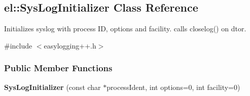 \hypertarget{a00088}{}\subsection{el\+:\+:Sys\+Log\+Initializer Class Reference}
\label{a00088}


Initializes syslog with process I\+D, options and facility. calls closelog() on d\textquotesingle{}tor.  




{\ttfamily \#include $<$easylogging++.\+h$>$}

\subsubsection*{Public Member Functions}
\begin{DoxyCompactItemize}
\item 
\hypertarget{a00088_aae71ee83f45c4cf770fbc6c6e87d9406}{}{\bfseries Sys\+Log\+Initializer} (const char $\ast$process\+Ident, int options=0, int facility=0)\label{a00088_aae71ee83f45c4cf770fbc6c6e87d9406}

\end{DoxyCompactItemize}
